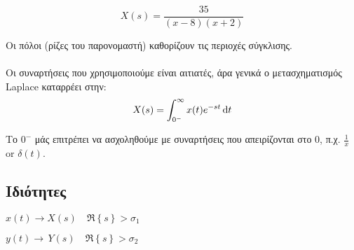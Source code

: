     \[
    X(s) = \frac{35}{(x-8)(x+2)}
    \]
    
    
    Οι πόλοι (ρίζες του παρονομαστή) καθορίζουν τις περιοχές σύγκλισης.
    
    \paragraph{}
    Οι συναρτήσεις που χρησιμοποιούμε είναι αιτιατές, άρα γενικά ο μετασχηματισμός
    Laplace καταρρέει στην:
    \[
    X(s) = \int_{0^-}^{\infty} x(t)e^{-st}\dif t
    \]
    
    Το \( 0^- \) μάς επιτρέπει να ασχοληθούμε με συναρτήσεις που απειρίζονται
    στο 0, π.χ. \( \frac{1}{x} \) or \( \delta(t) \).
    
    \subsection{Ιδιότητες}
    \( x(t)\to X(s) \quad \Re\left\lbrace s \right\rbrace > \sigma_1 \)
    
    \( y(t)\to\, Y(s) \quad \Re\left\lbrace s \right\rbrace > \sigma_2 \)
    

